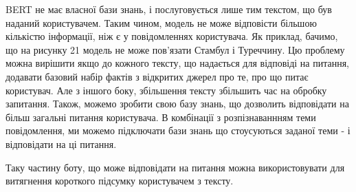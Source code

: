 BERT не має власної бази знань, і послуговується лише тим текстом, що був наданий користувачем. Таким чином, модель не може відповісти більшою кількістю інформації, ніж є у повідомленнях користувача. Як приклад, бачимо, що на рисунку 21 модель не може пов'язати Стамбул і Туреччину. Цю проблему можна вирішити якщо до кожного тексту, що надається для відповіді на питання, додавати базовий набір фактів з відкритих джерел про те, про що питає користувач.  Але з іншого боку, збільшення тексту збільшить час на обробку запитання. Також, можемо зробити свою базу знань, що дозволить відповідати на більш загальні питання користувача. В комбінації з розпізнаваннням теми повідомлення, ми можемо підключати бази знань що стоусуються заданої теми - і відповідати на ці питання.

Таку частину боту, що може відповідати на питання можна використовувати для витягнення короткого підсумку користувачем з тексту.




